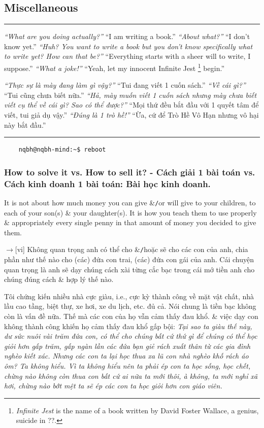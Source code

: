 \documentclass[12pt,twoside]{book}
\begin{document}

\subsection{Miscellaneous}
\hrule
\begin{multicols}{2}\small
	{\it ``What are you doing actually?''} ``I am writing a book.'' {\it ``About what?''} ``I don't know yet.'' {\it ``Huh? You want to write a book but you don't know specifically what to write yet? How can that be?''} ``Everything starts with a sheer will to write, I suppose.'' {\it ``What a joke!''} ``Yeah, let my innocent Infinite Jest \footnote{{\it Infinite Jest} is the name of a book written by {\sc David Foster Wallace}, a genius, suicide in ??.} begin.''
	\columnbreak
	
	{\it ``Thực sự là mày đang làm gì vậy?''} ``Tui đang viết 1 cuốn sách.'' {\it ``Về cái gì?''} ``Tui cũng chưa biết nữa.'' {\it ``Hả, mày muốn viết 1 cuốn sách nhưng mày chưa biết viết cụ thể về cái gì? Sao có thể được?''} ``Mọi thứ đều bắt đầu với 1 quyết tâm để viết, tui giả dụ vậy.'' {\it ``Đúng là 1 trò hề!''} ``Ừa, cứ để Trò Hề Vô Hạn nhưng vô hại này bắt đầu.''	
\end{multicols}
\hrule
\noindent
\begin{verbatim}
	nqbh@nqbh-mind:~$ reboot
\end{verbatim}

\subsubsection{How to solve it vs. How to sell it? - Cách giải 1 bài toán vs. Cách kinh doanh 1 bài toán: Bài học kinh doanh.}
It is not about how much money you can give \&{\tt/}or will give to your children, to each of your son(s) \& your daughter(s). It is how you teach them to use properly \& appropriately every single penny in that amount of money you decided to give them.

{\sf[en]$\to$[vi]} Không quan trọng anh có thể cho \&{\tt/}hoặc sẽ cho các con của anh, chia phần như thế nào cho (các) đứa con trai, (các) đứa con gái của anh. Cái chuyện quan trọng là anh sẽ dạy chúng cách xài từng cắc bạc trong cái mớ tiền anh cho chúng đúng cách \& hợp lý thế nào.

Tôi chứng kiến nhiều nhà cực giàu, i.e., cực kỳ thành công về mặt vật chất, nhà lầu cao tầng, biệt thự, xe hơi, xe du lịch, etc. đủ cả. Nói chung là tiền bạc không còn là vấn đề nữa. Thế mà các con của họ vẫn cảm thấy đau khổ. \& việc dạy con không thành công khiến họ cảm thấy đau khổ gấp bội: {\it Tại sao ta giàu thế này, dư sức nuôi vài trăm đứa con, có thể cho chúng bất cứ thứ gì để chúng có thể học giỏi hơn gấp trăm, gấp ngàn lần các đứa bạn giẻ rách xuất thân từ các gia đình nghèo kiết xác. Nhưng các con ta lại học thua xa lũ con nhà nghèo khố rách áo ôm? Ta không hiểu. Vì ta không hiểu nên ta phải ép con ta học sống, học chết, chừng nào không còn thua con bất cứ ai nữa ta mới thôi, à không, ta mới nghỉ xã hơi, chừng nào bớt mệt ta sẽ ép các con ta học giỏi hơn con giáo viên.}
\end{document}
